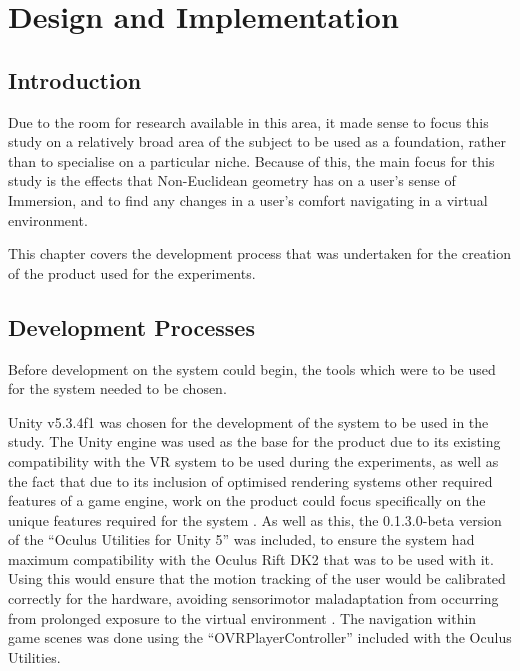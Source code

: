 \chapter[Product]{Design and Implementation}
\label{design}

	\section{Introduction}
	\label{design:intro}

		Due to the room for research available in this area, it made sense to focus this study on a relatively broad area of the subject to be used as a foundation, rather than to specialise on a particular niche.
		Because of this, the main focus for this study is the effects that Non-Euclidean geometry has on a user's sense of Immersion, and to find any changes in a user's comfort navigating in a virtual environment.

		This chapter covers the development process that was undertaken for the creation of the product used for the experiments.

	\section{Development Processes}
	\label{design:dev}

		Before development on the system could begin, the tools which were to be used for the system needed to be chosen.

		Unity v5.3.4f1 \cite{UnityTechnologies2016} was chosen for the development of the system to be used in the study.
		The Unity engine was used as the base for the product due to its existing compatibility with the VR system to be used during the experiments, as well as the fact that due to its inclusion of optimised rendering systems other required features of a game engine, work on the product could focus specifically on the unique features required for the system \cite{Bruce2012}.
		As well as this, the 0.1.3.0-beta version of the \enquote{Oculus Utilities for Unity 5} \cite{Oculus2016} was included, to ensure the system had maximum compatibility with the Oculus Rift DK2 that was to be used with it.
		Using this would ensure that the motion tracking of the user would be calibrated correctly for the hardware, avoiding sensorimotor maladaptation from occurring from prolonged exposure to the virtual environment \cite{Wright2014}.
		The navigation within game scenes was done using the \enquote{OVRPlayerController} included with the Oculus Utilities.

